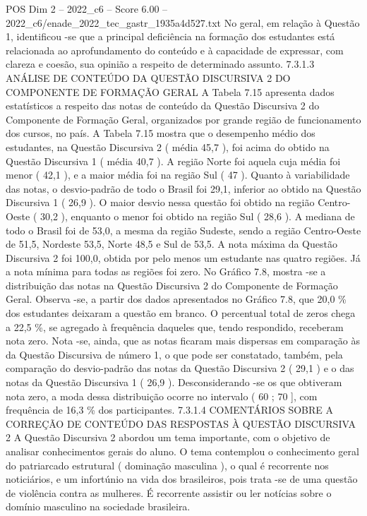 \begin{textsample}{POS Dim 2 – 2022\_c6 – Score 6.00 – 2022\_c6/enade\_2022\_tec\_gastr\_1935a4d527.txt}
No geral, em relação à Questão 1, identificou -se que a principal deficiência na formação dos estudantes está relacionada ao aprofundamento do conteúdo e à capacidade de expressar, com clareza e coesão, sua opinião a respeito de determinado assunto. 7.3.1.3 ANÁLISE DE CONTEÚDO DA QUESTÃO DISCURSIVA 2 DO COMPONENTE DE FORMAÇÃO GERAL A Tabela 7.15 apresenta dados estatísticos a respeito das notas de conteúdo da Questão Discursiva 2 do Componente de Formação Geral, organizados por grande região de funcionamento dos cursos, no país.
A Tabela 7.15 mostra que o desempenho médio dos estudantes, na Questão Discursiva 2 ( média 45,7 ), foi acima do obtido na Questão Discursiva 1 ( média 40,7 ).
A região Norte foi aquela cuja média foi menor ( 42,1 ), e a maior média foi na região Sul ( 47 ).
Quanto à variabilidade das notas, o desvio-padrão de todo o Brasil foi 29,1, inferior ao obtido na Questão Discursiva 1 ( 26,9 ).
O maior desvio nessa questão foi obtido na região Centro-Oeste ( 30,2 ), enquanto o menor foi obtido na região Sul ( 28,6 ).
A mediana de todo o Brasil foi de 53,0, a mesma da região Sudeste, sendo a região Centro-Oeste de 51,5, Nordeste 53,5, Norte 48,5 e Sul de 53,5.
A nota máxima da Questão Discursiva 2 foi 100,0, obtida por pelo menos um estudante nas quatro regiões.
Já a nota mínima para todas as regiões foi zero.
No Gráfico 7.8, mostra -se a distribuição das notas na Questão Discursiva 2 do Componente de Formação Geral.
Observa -se, a partir dos dados apresentados no Gráfico 7.8, que 20,0 \% dos estudantes deixaram a questão em branco.
O percentual total de zeros chega a 22,5 \%, se agregado à frequência daqueles que, tendo respondido, receberam nota zero.
Nota -se, ainda, que as notas ficaram mais dispersas em comparação às da Questão Discursiva de número 1, o que pode ser constatado, também, pela comparação do desvio-padrão das notas da Questão Discursiva 2 ( 29,1 ) e o das notas da Questão Discursiva 1 ( 26,9 ).
Desconsiderando -se os que obtiveram nota zero, a moda dessa distribuição ocorre no intervalo ( 60 ; 70 ], com frequência de 16,3 \% dos participantes. 7.3.1.4 COMENTÁRIOS SOBRE A CORREÇÃO DE CONTEÚDO DAS RESPOSTAS À QUESTÃO DISCURSIVA 2 A Questão Discursiva 2 abordou um tema importante, com o objetivo de analisar conhecimentos gerais do aluno.
O tema contemplou o conhecimento geral do patriarcado estrutural ( dominação masculina ), o qual é recorrente nos noticiários, e um infortúnio na vida dos brasileiros, pois trata -se de uma questão de violência contra as mulheres.
É recorrente assistir ou ler notícias sobre o domínio masculino na sociedade brasileira.

\end{textsample}
